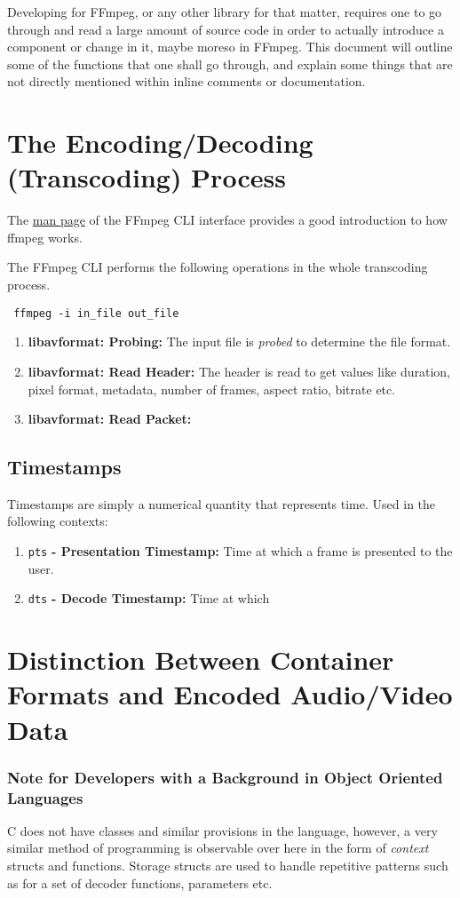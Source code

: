 \documentclass{article}
\begin{document}
Developing for FFmpeg, or any other library for that matter, requires one to go through and read a large amount of source code in order to actually introduce a component or change in it, maybe moreso in FFmpeg. This document will outline some of the functions that one shall go through, and explain some things that are not directly mentioned within inline comments or documentation.

\section{The Encoding/Decoding (Transcoding) Process}

The \href{https://ffmpeg.org/ffmpeg.html\#toc-Detailed-description}{man page} of the FFmpeg CLI interface provides a good introduction to how ffmpeg works.

The FFmpeg CLI performs the following operations in the whole transcoding process.

\texttt{
ffmpeg -i in\_file out\_file
}

\begin{enumerate}
\item \textbf{libavformat: Probing:} The input file is \emph{probed} to determine the file format.
\item \textbf{libavformat: Read Header:} The header is read to get values like duration, pixel format, metadata, number of frames, aspect ratio, bitrate etc.
\item \textbf{libavformat: Read Packet:} 
\end{enumerate}

\subsection{Timestamps}

Timestamps are simply a numerical quantity that represents time. Used in the following contexts:

\begin{enumerate}
\item \texttt{pts} \textbf{- Presentation Timestamp:} Time at which a frame is presented to the user.
\item \texttt{dts} \textbf{- Decode Timestamp:} Time at which 
\end{enumerate}

\section{Distinction Between Container Formats and Encoded Audio/Video Data}

\subsubsection{Note for Developers with a Background in Object Oriented Languages}

C does not have classes and similar provisions in the language, however, a very similar method of programming is observable over here in the form of \emph{context} structs and functions. Storage structs are used to handle repetitive patterns such as for a set of decoder functions, parameters etc.

\end{document}

